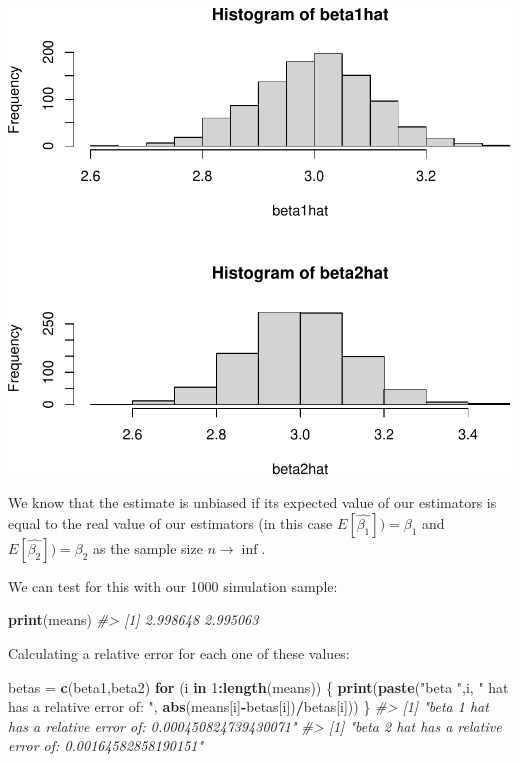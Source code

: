 \documentclass[]{article}
\newenvironment{Shaded}{\begin{snugshade}}{\end{snugshade}}
\newcommand{\CommentTok}[1]{\textcolor[rgb]{0.56,0.35,0.01}{\textit{#1}}}
\newcommand{\ControlFlowTok}[1]{\textcolor[rgb]{0.13,0.29,0.53}{\textbf{#1}}}
\newcommand{\DecValTok}[1]{\textcolor[rgb]{0.00,0.00,0.81}{#1}}
\newcommand{\KeywordTok}[1]{\textcolor[rgb]{0.13,0.29,0.53}{\textbf{#1}}}
\newcommand{\NormalTok}[1]{#1}
\newcommand{\OperatorTok}[1]{\textcolor[rgb]{0.81,0.36,0.00}{\textbf{#1}}}
\newcommand{\StringTok}[1]{\textcolor[rgb]{0.31,0.60,0.02}{#1}}
\begin{document}
\includegraphics{./figures/unnamed-chunk-4-1.pdf}

We know that the estimate is unbiased if its expected value of our
estimators is equal to the real value of our estimators (in this case
\(E[ \hat{\beta_{1}}]) = \beta_{1}\) and
\(E[ \hat{\beta_{2}}]) = \beta_{2}\) as the sample size
\(n \rightarrow \inf\).

We can test for this with our 1000 simulation sample:

\begin{Shaded}
\begin{Highlighting}[]
\KeywordTok{print}\NormalTok{(means)}
\CommentTok{#> [1] 2.998648 2.995063}
\end{Highlighting}
\end{Shaded}

Calculating a relative error for each one of these values:

\begin{Shaded}
\begin{Highlighting}[]
\NormalTok{betas =}\StringTok{ }\KeywordTok{c}\NormalTok{(beta1,beta2)}
\ControlFlowTok{for}\NormalTok{ (i }\ControlFlowTok{in} \DecValTok{1}\OperatorTok{:}\KeywordTok{length}\NormalTok{(means)) \{}
    \KeywordTok{print}\NormalTok{(}\KeywordTok{paste}\NormalTok{(}\StringTok{"beta "}\NormalTok{,i, }\StringTok{" hat has a relative error of: "}\NormalTok{, }\KeywordTok{abs}\NormalTok{(means[i]}\OperatorTok{-}\NormalTok{betas[i])}\OperatorTok{/}\NormalTok{betas[i]))}
\NormalTok{\}   }
\CommentTok{#> [1] "beta  1  hat has a relative error of:  0.000450824739430071"}
\CommentTok{#> [1] "beta  2  hat has a relative error of:  0.00164582858190151"}
\end{Highlighting}
\end{Shaded}
\end{document}
